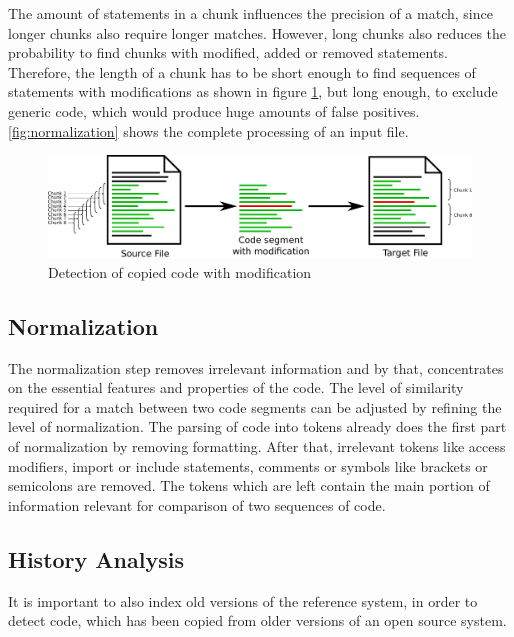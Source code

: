 The amount of statements in a chunk influences the precision of a match, since longer chunks also require longer matches.
However, long chunks also reduces the probability to find chunks with modified, added or removed statements.
Therefore, the length of a chunk has to be short enough to find sequences of statements with modifications as shown in figure \ref{fig:modification}, but long enough, to exclude generic code, which would produce huge amounts of false positives.
\autoref{fig:normalization} shows the complete processing of an input file.

\begin{figure}[h]
	\centering
	\includegraphics[width=\linewidth]{figures/modification.pdf}
	\caption{Detection of copied code with modification}\label{fig:modification}
\end{figure}

\subsection{Normalization}\label{section:approach/creating_index/normalization}
The normalization step removes irrelevant information and by that, concentrates on the essential features and properties of the code.
The level of similarity required for a match between two code segments can be adjusted by refining the level of normalization.
The parsing of code into tokens already does the first part of normalization by removing formatting.
After that, irrelevant tokens like access modifiers, import or include statements, comments or symbols like brackets or semicolons are removed.
The tokens which are left contain the main portion of information relevant for comparison of two sequences of code.

\subsection{History Analysis}\label{section:approach/creating_index/history_analysis}
It is important to also index old versions of the reference system, in order to detect code, which has been copied from older versions of an open source system.

